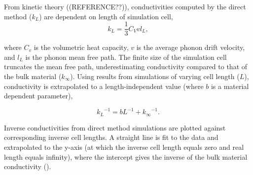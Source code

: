 \documentclass[%
preprint,                                  %
nofootinbib,
 amsmath,amssymb,
 aps,
]{revtex4-1}
\begin{document}



From kinetic theory ((REFERENCE??)), conductivities computed by the direct method ($k_L$) are dependent on length of simulation cell,
\begin{equation}
k_{L} = \frac{1}{3} C_{V} v l_{L} \label{length-dep},
\end{equation}

where $C_v$ is the volumetric heat capacity, $v$ is the average phonon drift velocity, and $l_L$ is the phonon mean free path. The finite size of the simulation cell truncates the mean free path, underestimating conductivity compared to that of the bulk material ($k_\infty$). Using results from simulations of varying cell length ($L$), conductivity is extrapolated to a length-independent value (where $b$ is a material dependent parameter),

\begin{equation}
{k_{L}}^{-1} = b L^{-1} + {k_{\infty}}^{-1} \label{linear-extrap}.
\end{equation}

Inverse conductivities from direct method simulations are plotted against corresponding inverse cell lengths. A straight line is fit to the data and extrapolated to the y-axis (at which the inverse cell length equals zero and real length equals infinity), where the intercept gives the inverse of the bulk material conductivity (\citet{Schelling2002}).

\end{document}
